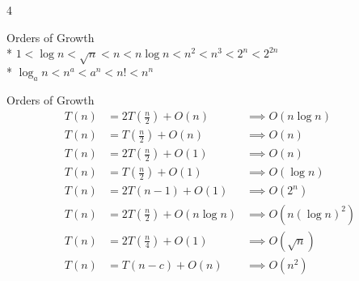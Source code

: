 \documentclass[fontsize=6pt, landscape, a4paper]{scrartcl}
\newenvironment{tightcenter}{%
  \setlength\topsep{0pt}
  \setlength\parskip{0pt}
  \begin{center}
}{%
  \end{center}
}
\begin{document}
\begin{multicols*}{4}
\begin{tightcenter}
        \vspace{1em} %
        Orders of Growth \\*
        $1 < \log n < \sqrt{n} < n < n \log n < n^{2} < n^{3} < 2^{n} < 2^{2n}$ \\*
        $\log_a n < n^{a} < a^{n} < n! < n^{n}$

        \vspace{1em}
        Orders of Growth
        \begin{align*}
            T(n) & = 2T\left(\frac{n}{2}\right) + O(n) & \implies O(n \log n)
            \\ T(n) & = T\left(\frac{n}{2}\right) + O(n) & \implies O(n)
            \\ T(n) & = 2T\left(\frac{n}{2}\right) + O(1) & \implies O(n)
            \\ T(n) & = T\left(\frac{n}{2}\right) + O(1) & \implies O(\log n)
            \\ T(n) & = 2T(n - 1) + O(1) & \implies O(2^{n})
            \\ T(n) & = 2T\left(\frac{n}{2}\right) + O(n \log n) & \implies O(n(\log n)^{2})
            \\ T(n) & = 2T\left(\frac{n}{4}\right) + O(1) & \implies O(\sqrt{n})
            \\ T(n) &= T(n - c) + O(n) &\implies O(n^{2})
        \end{align*}
    \end{tightcenter}
\end{multicols*}
\end{document}
